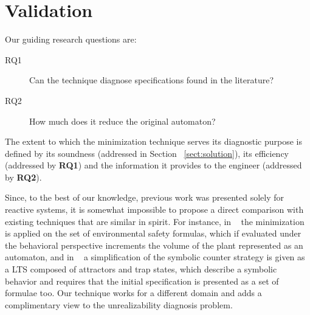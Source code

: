 \section{Validation}\label{sec:validation}
Our guiding research questions are:
\begin{description}
	\item[RQ1] Can the technique diagnose specifications found in the literature? 
	\item[RQ2] How much does it reduce the original automaton?
\end{description}
The extent to which the minimization technique serves its diagnostic purpose is defined by its soundness (addressed in Section ~\ref{sect:solution}), its efficiency (addressed by \textbf{RQ1}) and the information it provides to the engineer (addressed by \textbf{RQ2}).  



Since, to the best of our knowledge, previous work was presented solely for reactive systems,
it is somewhat impossible to propose a direct comparison with existing techniques that are similar in spirit. For instance, in ~\cite{DBLP:conf/hvc/KonighoferHB10} the minimization is applied on the set of environmental safety formulas, which if evaluated under the behavioral perspective increments the volume of the plant represented as an automaton, and in ~\cite{DBLP:conf/sigsoft/KuventMR17} a simplification of the symbolic counter strategy is given as a LTS composed of attractors and trap states, which describe a symbolic behavior and requires that the initial specification is presented as a set of formulae too. Our technique works for a different domain and adds a complimentary view to the unrealizability diagnosis problem.

